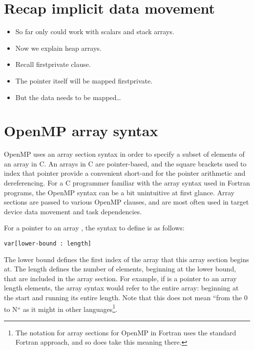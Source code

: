\section{Recap implicit data movement}
\begin{itemize}
  \item So far only could work with scalars and stack arrays.
  \item Now we explain heap arrays.
  \item Recall firstprivate clause.
  \item The pointer itself will be mapped firstprivate.
  \item But the data needs to be mapped\dots
\end{itemize}


\section{OpenMP array syntax}


OpenMP uses an array section syntax in order to specify a subset of elements of an array in C.
An arrays in C are pointer-based, and the square brackets used to index that pointer provide a convenient short-and for the pointer arithmetic and dereferencing.
For a C programmer familiar with the array syntax used in Fortran programs, the OpenMP syntax can be a bit unintuitive at first glance.
Array sections are passed to various OpenMP clauses, and are most often used in target device data movement and task dependencies.

For a pointer to an array , the syntax to define is as follows:
\begin{verbatim}
var[lower-bound : length]
\end{verbatim}
The lower bound defines the first index of the array that this array section begins at.
The length defines the number of elements, beginning at the lower bound, that are included in the array section.
For example, if  is a pointer to an array length  elements, the array syntax  would refer to the entire array: beginning at the start and running its entire length.
Note that this does not mean ``from the 0 to N`` as it might in other languages\footnote{The notation for array sections for OpenMP in Fortran uses the standard Fortran approach, and so does take this meaning there.}.

